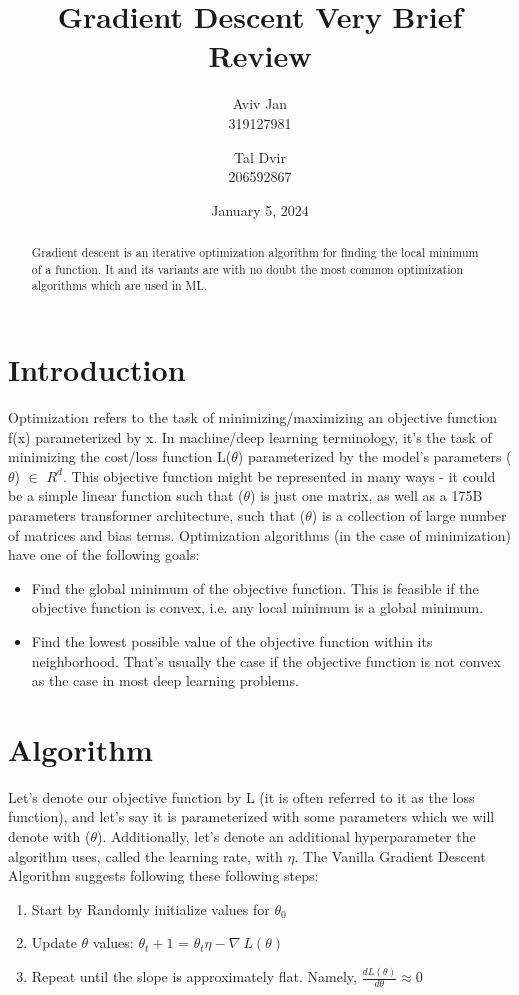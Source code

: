 \documentclass{article}
\title{Gradient Descent Very Brief Review}
\author{Aviv Jan \\319127981\\  \and Tal Dvir \\206592867\\ }
\date{January 5, 2024}
\begin{document}
\maketitle
 \begin{abstract}
    
     Gradient descent is an iterative optimization algorithm for finding the local minimum of a function. It and its variants are with no doubt the most common optimization algorithms which are used in ML.
 \end{abstract}


\section{Introduction}
\begin{minipage}{1\textwidth}
Optimization refers to the task of minimizing/maximizing an objective function f(x) parameterized
by x. In machine/deep learning terminology, it’s the task of minimizing the cost/loss function L($\theta$)
parameterized by the model’s parameters ($\theta$) $\in$ $R^d$. This objective function might be represented in
many ways - it could be a simple linear function such that ($\theta$) is just one matrix, as well as a 175B
parameters transformer architecture, such that ($\theta$) is a collection of large number of matrices and bias
terms. Optimization algorithms (in the case of minimization) have one of the following goals: 
\begin{itemize}
\item Find the global minimum of the objective function. This is feasible if the objective function is
convex, i.e. any local minimum is a global minimum.

\item Find the lowest possible value of the objective function within its neighborhood. That’s usually the
case if the objective function is not convex as the case in most deep learning problems.
\end{itemize}
\end{minipage}

\section{Algorithm}
\begin{flushleft}
Let’s denote our objective function by L (it is often referred to it as the loss function), and let’s say it is parameterized with some parameters which we will denote with ($\theta$). Additionally, let’s denote an additional hyperparameter the algorithm uses, called the learning rate, with $\eta$. The Vanilla Gradient Descent Algorithm suggests following these following steps:

\begin{enumerate}
    \item Start by Randomly initialize values for $\theta_0$
    \item Update $\theta$ values: $\theta_t+1$ = $\theta_t \eta - \nabla\ L(\theta)$
    \item Repeat until the slope is approximately flat. Namely, $\frac{dL(\theta)}{d\theta} \approx 0$
\end{enumerate}
\end{flushleft}
\end{document}
